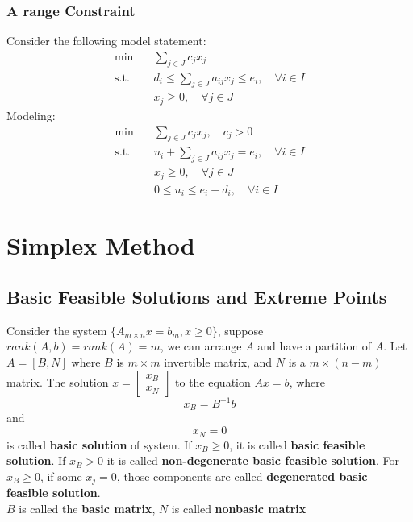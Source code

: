 			\subsection{A range Constraint}
				Consider the following model statement:
				\begin{align}
					\min \quad & \sum_{j\in J}c_jx_j \\
					\text{s.t.} \quad & d_i\le \sum_{j\in J}a_{ij}x_j \le e_i, \quad \forall i\in I \\
					                  & x_j \ge 0, \quad \forall j\in J 
				\end{align}
				Modeling:
				\begin{align}
					\min \quad & \sum_{j\in J}c_jx_j, \quad c_j > 0 \\
					\text{s.t.} \quad & u_i + \sum_{j\in J}a_{ij}x_j = e_i, \quad \forall i\in I \\
					                  & x_j \ge 0, \quad \forall j\in J \\
					                  & 0\le u_i \le e_i-d_i, \quad \forall i\in I 
				\end{align}

	\chapter{Simplex Method}
		\section{Basic Feasible Solutions and Extreme Points}
			\begin{definition}
				Consider the system $\{A_{m\times n}x=b_m, x\ge 0\}$, suppose $rank(A, b) = rank(A) =m$, we can arrange $A$ and have a partition of $A$. Let $A=[B, N]$ where $B$ is $m\times m$ invertible matrix, and $N$ is a $m\times (n-m)$ matrix. The solution $x=\left[\begin{matrix}x_B\\x_N\end{matrix}\right]$ to the equation $Ax=b$, where
				\begin{equation}
					x_B = B^{-1}b 
				\end{equation}
				and
				\begin{equation}
					x_N = 0 
				\end{equation}
				is called \textbf{basic solution} of system. If $x_B \ge 0$, it is called \textbf{basic feasible solution}. If $x_B > 0$ it is called \textbf{non-degenerate basic feasible solution}. For $x_B \ge 0$, if some $x_j = 0$, those components are called \textbf{degenerated basic feasible solution}.\\
				$B$ is called the \textbf{basic matrix}, $N$ is called \textbf{nonbasic matrix}				
			\end{definition}

